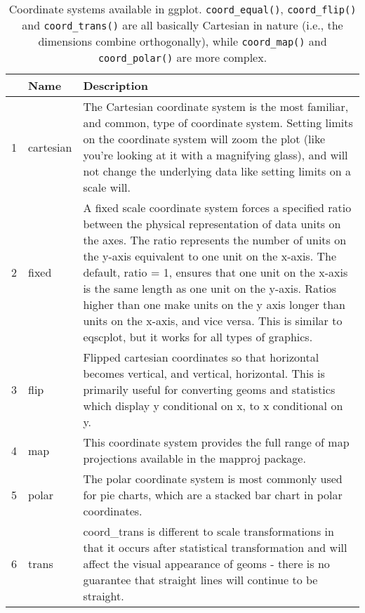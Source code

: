 \begin{table}[ht]
\centering
\begin{tabular}{rll}
  \hline
 & Name & Description \\ 
  \hline
1 & cartesian & The Cartesian coordinate system is the most familiar, and common, type of coordinate system. Setting limits on the coordinate system will zoom the plot (like you're looking at it with a magnifying glass), and will not change the underlying data like setting limits on a scale will. \\ 
  2 & fixed & A fixed scale coordinate system forces a specified ratio between the physical representation of data units on the axes. The ratio represents the number of units on the y-axis equivalent to one unit on the x-axis. The default, ratio = 1, ensures that one unit on the x-axis is the same length as one unit on the y-axis. Ratios higher than one make units on the y axis longer than units on the x-axis, and vice versa. This is similar to eqscplot, but it works for all types of graphics. \\ 
  3 & flip & Flipped cartesian coordinates so that horizontal becomes vertical, and vertical, horizontal. This is primarily useful for converting geoms and statistics which display y conditional on x, to x conditional on y. \\ 
  4 & map & This coordinate system provides the full range of map projections available in the mapproj package. \\ 
  5 & polar & The polar coordinate system is most commonly used for pie charts, which are a stacked bar chart in polar coordinates. \\ 
  6 & trans & coord\_trans is different to scale transformations in that it occurs after statistical transformation and will affect the visual appearance of geoms - there is no guarantee that straight lines will continue to be straight. \\ 
   \hline
\end{tabular}
\caption{Coordinate systems available in ggplot. 
\texttt{coord\_equal()}, \texttt{coord\_flip()} and \texttt{coord\_trans()} 
are all basically Cartesian in nature (i.e., the dimensions combine orthogonally), 
while \texttt{coord\_map()} and \texttt{coord\_polar()} are more complex.} 
\label{coord}
\end{table}
